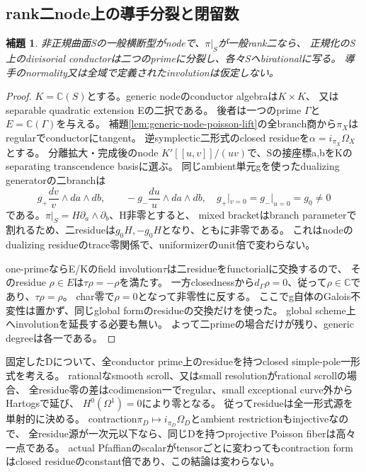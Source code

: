 \documentclass[a4paper,11pt]{ltjsarticle}
\newtheorem{lemma}[proposition]{補題}
\theoremstyle{definition}
\begin{document}
\subsection{rank二node上の導手分裂と閉留数}
\begin{lemma}\label{lem:ranktwo-node-conductor-split}
非正規曲面Sの一般横断型がnodeで、$\pi|_S$が一般rank二なら、
正規化のS上のdivisorial conductorは二つのprimeに分裂し、各々Sへbirationalに写る。
導手のnormality又は全域で定義されたinvolutionは仮定しない。
\end{lemma}
\begin{proof}
$K=\mathbb C(S)$とする。generic nodeのconductor algebraは$K\times K$、
又はseparable quadratic extension Eの二択である。
後者は一つのprime $\Gamma$と$E=\mathbb C(\Gamma)$を与える。
補題\ref{lem:generic-node-poisson-lift}の全branch商から$\pi_X$はregularでconductorにtangent。
逆symplectic二形式のclosed residueを$\alpha=i_{\pi_X}\Omega_X$とする。
分離拡大・完成後のnode $K'[[u,v]]/(uv)$で、Sの接座標a,bをKのseparating transcendence basisに選ぶ。
同じambient単元gを使ったdualizing generatorの二branchは
\[
 g_+\frac{dv}{v}\wedge da\wedge db,\qquad
 -g_-\frac{du}{u}\wedge da\wedge db,
 \quad g_+|_{v=0}=g_-|_{u=0}=g_0\ne0
\]
である。$\pi|_S=H\partial_a\wedge\partial_b$、H非零とすると、
mixed bracketはbranch parameterで割れるため、二residueは$g_0H,-g_0H$となり、ともに非零である。
これはnodeのdualizing residueのtrace零関係で、uniformizerのunit倍で変わらない。

one-primeならE/Kのfield involution$\tau$は二residueをfunctorialに交換するので、
そのresidue $\rho\in E$は$\tau\rho=-\rho$を満たす。
一方closednessから$d_\Gamma\rho=0$、従って$\rho\in\mathbb C$であり、$\tau\rho=\rho$。
char零で$\rho=0$となって非零性に反する。
ここでg自体のGalois不変性は置かず、同じglobal formのresidueの交換だけを使った。
global scheme上へinvolutionを延長する必要も無い。
よって二primeの場合だけが残り、generic degreeは各一である。
\end{proof}

固定したDについて、全conductor prime上のresidueを持つclosed simple-pole一形式を考える。
rationalなsmooth scroll、又はsmall resolutionがrational scrollの場合、
全residue零の差はcodimension一でregular、small exceptional curve外からHartogsで延び、
$H^0(\Omega^1)=0$により零となる。
従ってresidueは全一形式源を単射的に決める。
contraction$\pi_D\mapsto i_{\pi_D}\Omega_D$とambient restrictionもinjectiveなので、
全residue源が一次元以下なら、同じDを持つprojective Poisson fiberは高々一点である。
actual Pfaffianのscalarがtensorごとに変わってもcontraction formはclosed residueのconstant倍であり、この結論は変わらない。
\end{document}
